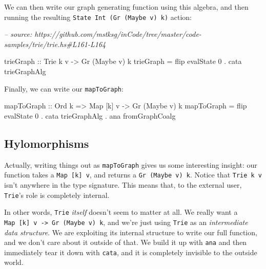 \documentclass[]{article}
\newenvironment{Shaded}{}{}
\newcommand{\CommentTok}[1]{\textcolor[rgb]{0.38,0.63,0.69}{\textit{#1}}}
\newcommand{\DataTypeTok}[1]{\textcolor[rgb]{0.56,0.13,0.00}{#1}}
\newcommand{\DecValTok}[1]{\textcolor[rgb]{0.25,0.63,0.44}{#1}}
\newcommand{\FunctionTok}[1]{\textcolor[rgb]{0.02,0.16,0.49}{#1}}
\newcommand{\NormalTok}[1]{#1}
\newcommand{\OtherTok}[1]{\textcolor[rgb]{0.00,0.44,0.13}{#1}}
\begin{document}
We can then write our graph generating function using this algebra, and then
running the resulting \texttt{State\ Int\ (Gr\ (Maybe\ v)\ k)} action:

\begin{Shaded}
\begin{Highlighting}[]
\CommentTok{-- source: https://github.com/mstksg/inCode/tree/master/code-samples/trie/trie.hs#L161-L164}

\NormalTok{trieGraph}
\OtherTok{    ::} \DataTypeTok{Trie}\NormalTok{ k v}
    \OtherTok{->} \DataTypeTok{Gr}\NormalTok{ (}\DataTypeTok{Maybe}\NormalTok{ v) k}
\NormalTok{trieGraph }\FunctionTok{=} \FunctionTok{flip}\NormalTok{ evalState }\DecValTok{0} \FunctionTok{.}\NormalTok{ cata trieGraphAlg}
\end{Highlighting}
\end{Shaded}

Finally, we can write our \texttt{mapToGraph}:

\begin{Shaded}
\begin{Highlighting}[]
\NormalTok{mapToGraph}
\OtherTok{    ::} \DataTypeTok{Ord}\NormalTok{ k}
    \OtherTok{=>} \DataTypeTok{Map}\NormalTok{ [k] v}
    \OtherTok{->} \DataTypeTok{Gr}\NormalTok{ (}\DataTypeTok{Maybe}\NormalTok{ v) k}
\NormalTok{mapToGraph }\FunctionTok{=} \FunctionTok{flip}\NormalTok{ evalState }\DecValTok{0}
           \FunctionTok{.}\NormalTok{ cata trieGraphAlg}
           \FunctionTok{.}\NormalTok{ ana fromGraphCoalg}
\end{Highlighting}
\end{Shaded}

\hypertarget{hylomorphisms}{%
\subsection{Hylomorphisms}\label{hylomorphisms}}

Actually, writing things out as \texttt{mapToGraph} gives us some interesting
insight: our function takes a \texttt{Map\ {[}k{]}\ v}, and returns a
\texttt{Gr\ (Maybe\ v)\ k}. Notice that \texttt{Trie\ k\ v} isn't anywhere in
the type signature. This means that, to the external user, \texttt{Trie}'s role
is completely internal.

In other words, \texttt{Trie} \emph{itself} doesn't seem to matter at all. We
really want a \texttt{Map\ {[}k{]}\ v\ -\textgreater{}\ Gr\ (Maybe\ v)\ k}, and
we're just using \texttt{Trie} as an \emph{intermediate data structure}. We are
exploiting its internal structure to write our full function, and we don't care
about it outside of that. We build it up with \texttt{ana} and then immediately
tear it down with \texttt{cata}, and it is completely invisible to the outside
world.
\end{document}
